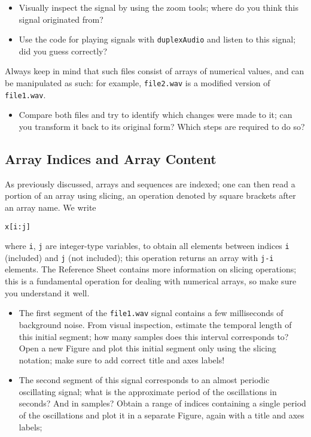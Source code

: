 \begin{itemize}
	\item Visually inspect the signal by using the zoom tools; where do you think this signal originated from? 
	\item Use the code for playing signals with {\tt duplexAudio} and listen to this signal; did you guess correctly?
\end{itemize}

Always keep in mind that such files consist of arrays of numerical values, and can be manipulated as such: for example, {\tt file2.wav} is a modified version of {\tt file1.wav}.

\begin{itemize}
	\item Compare both files and try to identify which changes were made to it; can you transform it back to its original form? Which steps are required to do so?
\end{itemize} 

\subsection{Array Indices and Array Content}

As previously discussed, arrays and sequences are indexed; one can then read a portion of an array using slicing, an operation denoted by square brackets after an array name. We write

\begin{lstlisting}[frame=single]
x[i:j]
\end{lstlisting}

where {\tt i}, {\tt j} are integer-type variables, to obtain all elements between indices {\tt i} (included) and {\tt j} (not included); this operation returns an array with {\tt j-i} elements. The Reference Sheet contains more information on slicing operations; this is a fundamental operation for dealing with numerical arrays, so make sure you understand it well.

\begin{itemize}
	\item The first segment of the {\tt file1.wav} signal contains a few milliseconds of background noise. From visual inspection, estimate the temporal length of this initial segment; how many samples does this interval corresponds to? Open a new Figure and plot this initial segment only using the slicing notation; make sure to add correct title and axes labels!
	\item The second segment of this signal corresponds to an almost periodic oscillating signal; what is the approximate period of the oscillations in seconds? And in samples? Obtain a range of indices containing a single period of the oscillations and plot it in a separate Figure, again with a title and axes labels;
\end{itemize}

